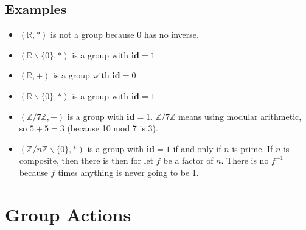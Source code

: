 \documentclass[12pt]{article}
\begin{document}
\subsection{Examples}
\begin{itemize}
\item $(\mathbb{R},*)$ is not a group because 0 has no inverse.
\item $(\mathbb{R}\backslash\{0\},*)$ is a group with $\textbf{id} = 1$
\item $(\mathbb{R},+)$ is a group with $\textbf{id} = 0$
\item $(\mathbb{R}\backslash\{0\},*)$ is a group with $\textbf{id} = 1$
\item $(\mathbb{Z}\slash 7\mathbb{Z},+)$ is a group with $\textbf{id} = 1$. $\mathbb{Z}\slash 7\mathbb{Z}$ means using modular arithmetic, so $5 + 5 = 3$ (because 10 mod 7 is 3).
\item $(\mathbb{Z}\slash n\mathbb{Z}\backslash\{0\},*)$ is a group with $\textbf{id} = 1$ if and only if $n$ is prime. If $n$ is composite, then there is then for let $f$ be a factor of $n$. There is no $f^{-1}$ because $f$ times anything is never going to be 1.
 
\end{itemize}

\section{Group Actions}
\end{document}
